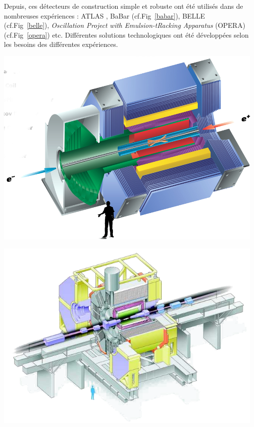 Depuis, ces détecteurs de construction simple et robuste ont été utilisés dans de nombreuses expériences : ATLAS \cite{ATLAS}, BaBar \cite{Boutigny:1995ib} (cf.Fig~\ref{babar}), BELLE \cite{ABASHIAN2002117} (cf.Fig~\ref{belle}),  \textit{Oscillation Project with Emulsion-tRacking Apparatus} (OPERA) \cite{1748-0221-9-10-C10003} (cf.Fig~\ref{opera}) etc. Différentes solutions technologiques ont été développées selon les besoins des différentes expériences.

\marginpar
{
	\centering
	\includegraphics[width=\marginparwidth]{RPC/babar.png}
	\label{babar}
}

\marginpar
{
	\centering
	\includegraphics[width=\marginparwidth]{RPC/belle.png}
	\label{belle}
}

